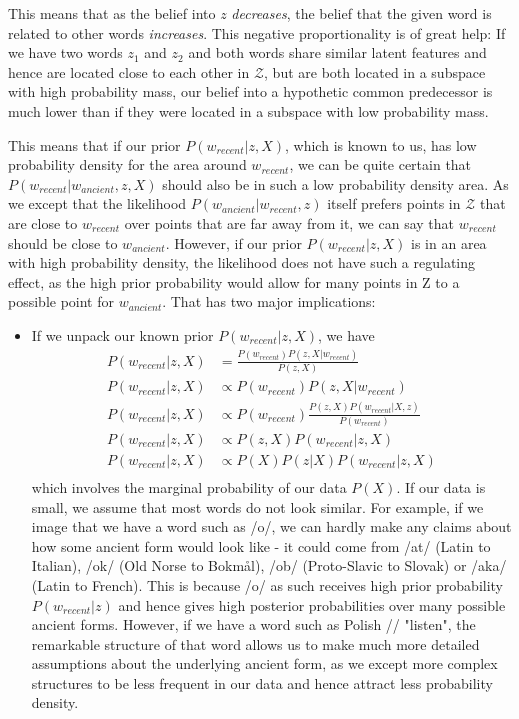 \documentclass[6pt]{article}
\begin{document}
This means that as the belief into $z$ \textit{decreases}, the belief that the given word is related to other words \textit{increases}. This negative proportionality is of great help: If we have two words $z_1$ and $z_2$ and both words share similar latent features and hence are located close to each other in $\mathcal{Z}$, but are both located in a subspace with high probability mass, our belief into a hypothetic common predecessor is much lower than if they were located in a subspace with low probability mass.

This means that if our prior $P(w_{recent}|z,X)$, which is known to us, has low probability density for the area around $w_{recent}$, we can be quite certain that $P(w_{recent}|w_{ancient},z,X)$ should also be in such a low probability density area. As we except that the likelihood  $P(w_{ancient}|w_{recent},z)$ itself prefers points in $\mathcal{Z}$ that are close to $w_{recent}$ over points that are far away from it, we can say that $w_{recent}$ should be close to $w_{ancient}$. 
However, if our prior $P(w_{recent}|z,X)$ is in an area with high probability density, the likelihood does not have such a regulating effect, as the high prior probability would allow for many points in Z to a possible point for $w_{ancient}$. 
That has two major implications:


\begin{itemize}
\item  If we unpack our known prior $P(w_{recent}|z,X)$, we have
\begin{equation}
\begin{split}
P(w_{recent}|z,X)  & = \frac{P(w_{recent})P(z,X|w_{recent})}{P(z,X)} \\
P(w_{recent}|z,X) & \propto P(w_{recent})P(z,X|w_{recent})\\
P(w_{recent}|z,X) & \propto P(w_{recent})\frac{P(z,X)P(w_{recent}|X,z)}{P(w_{recent})}\\
P(w_{recent}|z,X) & \propto P(z,X)P(w_{recent}|z,X)\\
P(w_{recent}|z,X) & \propto P(X)P(z|X)P(w_{recent}|z,X)\\
\end{split}
\end{equation}
which involves the marginal probability of our data $P(X)$. If our data is small,  we assume that most words do not look similar. 
For example, if we image that we have a word such as  /o/, we can hardly make any claims about how some ancient form would look like - it could come from /at/ (Latin to Italian), /ok/ (Old Norse to Bokm\r{a}l), /ob/ (Proto-Slavic to Slovak) or /aka/ (Latin to French). This is because /o/ as such receives high prior probability $P(w_{recent}|z)$ and hence gives high posterior probabilities over many possible ancient forms. However, if we have a word such as Polish // "listen", the remarkable structure of that word allows us to make much more detailed assumptions about the underlying ancient form, as we except more complex structures to be less frequent in our data and hence attract less probability density. 

\end{itemize}
\end{document}
